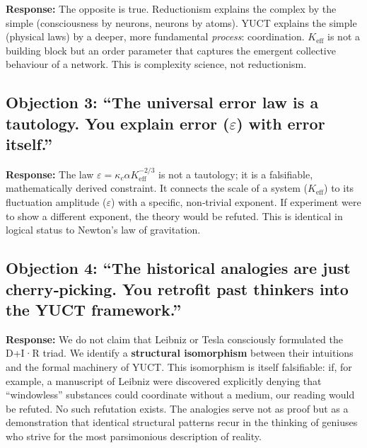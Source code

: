 \documentclass[12pt,a4paper]{article}
\newcommand{\Keff}{K_{\mathrm{eff}}}
\begin{document}
	\textbf{Response:} The opposite is true. Reductionism explains the complex by the simple (consciousness by neurons, neurons by atoms). YUCT explains the simple (physical laws) by a deeper, more fundamental \emph{process}: coordination. \(\Keff\) is not a building block but an order parameter that captures the emergent collective behaviour of a network. This is complexity science, not reductionism.
	
	\subsection*{Objection 3: ``The universal error law is a tautology. You explain error (\(\varepsilon\)) with error itself.''}
	
	\textbf{Response:} The law \(\varepsilon = \kappa_c \alpha \Keff^{-2/3}\) is not a tautology; it is a falsifiable, mathematically derived constraint. It connects the scale of a system (\(\Keff\)) to its fluctuation amplitude (\(\varepsilon\)) with a specific, non‑trivial exponent. If experiment were to show a different exponent, the theory would be refuted. This is identical in logical status to Newton’s law of gravitation.
	
	\subsection*{Objection 4: ``The historical analogies are just cherry‑picking. You retrofit past thinkers into the YUCT framework.''}
	
	\textbf{Response:} We do not claim that Leibniz or Tesla consciously formulated the D+I·R triad. We identify a \textbf{structural isomorphism} between their intuitions and the formal machinery of YUCT. This isomorphism is itself falsifiable: if, for example, a manuscript of Leibniz were discovered explicitly denying that ``windowless'' substances could coordinate without a medium, our reading would be refuted. No such refutation exists. The analogies serve not as proof but as a demonstration that identical structural patterns recur in the thinking of geniuses who strive for the most parsimonious description of reality.
	
\end{document}
